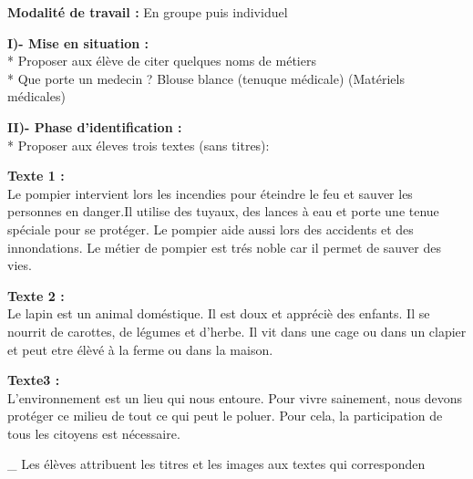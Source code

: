 \documentclass[a4paper,11pt]{article}
\begin{document}
\vspace{3pt}
\noindent\textbf{Modalité de travail :} En groupe puis individuel

\vspace{4pt}
\noindent\textbf{I)- Mise en situation :}\\
* Proposer aux élève de citer quelques noms de métiers\\
* Que porte un medecin ? Blouse blance (tenuque médicale) (Matériels médicales)

\vspace{4pt}
\noindent\textbf{II)- Phase d'identification :}\\
* Proposer aux éleves trois textes (sans titres):

\vspace{2pt}
\begin{tcolorbox}[colback=white,colframe=black,arc=0mm,boxrule=0.8pt,top=3pt,bottom=3pt,left=5pt,right=5pt]
\textbf{Texte 1 :}\\
Le pompier intervient lors les incendies pour éteindre le feu et sauver les personnes en danger.Il utilise des tuyaux, des lances à eau et porte une tenue spéciale pour se protéger. Le pompier aide aussi lors des accidents et des innondations. Le métier de pompier est trés noble car il permet de sauver des vies.
\end{tcolorbox}

\vspace{-3pt}
\begin{tcolorbox}[colback=white,colframe=black,arc=0mm,boxrule=0.8pt,top=3pt,bottom=3pt,left=5pt,right=5pt]
\textbf{Texte 2 :}\\
Le lapin est un animal doméstique. Il est doux et appréciè des enfants. Il se nourrit de carottes, de légumes et d'herbe. Il vit dans une cage ou dans un clapier et peut etre élèvé à la ferme ou dans la maison.
\end{tcolorbox}

\vspace{-3pt}
\begin{tcolorbox}[colback=white,colframe=black,arc=0mm,boxrule=0.8pt,top=3pt,bottom=3pt,left=5pt,right=5pt]
\textbf{Texte3 :}\\
L'environnement est un lieu qui nous entoure. Pour vivre sainement, nous devons protéger ce milieu de tout ce qui peut le poluer. Pour cela, la participation de tous les citoyens est nécessaire.
\end{tcolorbox}

\vspace{2pt}
\noindent\_ Les élèves attribuent les titres et les images aux textes qui corresponden
\end{document}
